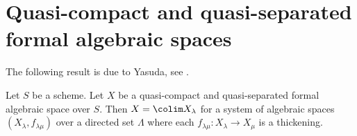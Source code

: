 \section{Quasi-compact and quasi-separated formal algebraic spaces}
\label{section-quasi-compact-quasi-separated}

\noindent
The following result is due to Yasuda, see
\cite[Proposition 3.32]{Yasuda}.

\begin{lemma}
\label{lemma-structure-quasi-compact-quasi-separated}
\begin{reference}
\cite[Proposition 3.32]{Yasuda}
\end{reference}
Let $S$ be a scheme. Let $X$ be a quasi-compact and quasi-separated
formal algebraic space over $S$. Then $X = \colim X_\lambda$
for a system of algebraic spaces $(X_\lambda, f_{\lambda \mu})$
over a directed set $\Lambda$ where each
$f_{\lambda \mu} : X_\lambda \to X_\mu$ is a thickening.
\end{lemma}

